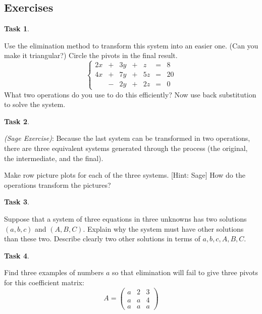 \documentclass[10pt,]{book}
\theoremstyle{plain}
\theoremstyle{definition}
\numberwithin{equation}{section}
\newtheorem{task}{Task}[chapter]
\begin{document}
\subsection[Exercises]{Exercises}\label{subsection-28}
\begin{task}
\label{task-38}

          Use the elimination method to transform this system into an easier
          one. (Can you make it triangular?) Circle the pivots in the final
          result.
          \[
            \left\{
            \begin{array}{rrrrrrr}
            2x & + & 3y & + &  z & = & 8\\
            4x & + & 7y & + & 5z & = & 20 \\
               & - & 2y & + & 2z & = & 0
            \end{array}\right.
          \]
          What two operations do you use to do this efficiently? Now use back
          substitution to solve the system.
        \end{task}
\begin{task}
\label{task-39}

            \emph{(Sage Exercise)}:
            Because the last system can be transformed in two operations, there
            are three equivalent systems generated through the process
            (the original, the intermediate, and the final).
\par

            Make row picture plots for each of the three systems. [Hint: Sage]
            How do the operations transform the pictures?
\end{task}
\begin{task}
\label{task-40}

          Suppose that a system of three equations in three unknowns has two
          solutions \((a,b,c)\) and \((A,B,C)\). Explain why the system must have
          other solutions than these two. Describe clearly two other solutions
          in terms of \(a,b,c,A,B,C\).
        \end{task}
\begin{task}
\label{task-41}

          Find three examples of numbers \(a\) so that elimination will fail to
          give three pivots for this coefficient matrix:
          \[
            A = \begin{pmatrix}
            a & 2 & 3 \\ a & a & 4 \\ a & a & a
            \end{pmatrix}
          \]\end{task}
\end{document}
